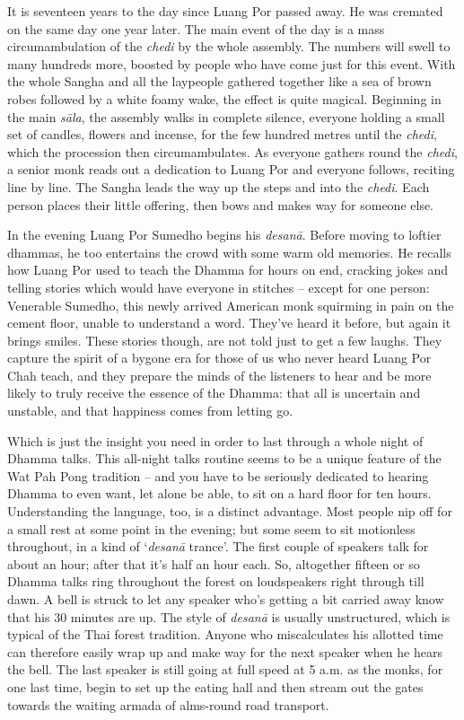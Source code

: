 It is seventeen years to the day since Luang Por passed away. He was
cremated on the same day one year later. The main event of the day is a
mass circumambulation of the \emph{chedi} by the whole assembly. The
numbers will swell to many hundreds more, boosted by people who have
come just for this event. With the whole Sangha and all the laypeople
gathered together like a sea of brown robes followed by a white foamy
wake, the effect is quite magical. Beginning in the main \emph{sāla}, 
the assembly walks in complete silence, everyone holding a small set of
candles, flowers and incense, for the few hundred metres until the
\emph{chedi}, which the procession then circumambulates. As everyone
gathers round the \emph{chedi}, a senior monk reads out a dedication to
Luang Por and everyone follows, reciting line by line. The Sangha leads
the way up the steps and into the \emph{chedi}. Each person places their
little offering, then bows and makes way for someone else. 

In the evening Luang Por Sumedho begins his \emph{desanā}. Before moving
to loftier dhammas, he too entertains the crowd with some warm old
memories. He recalls how Luang Por used to teach the Dhamma for hours on
end, cracking jokes and telling stories which would have everyone in
stitches -- except for one person: Venerable Sumedho, this newly arrived
American monk squirming in pain on the cement floor, unable to
understand a word. They've heard it before, but again it brings smiles. 
These stories though, are not told just to get a few laughs. They
capture the spirit of a bygone era for those of us who never heard Luang
Por Chah teach, and they prepare the minds of the listeners to hear and
be more likely to truly receive the essence of the Dhamma: that all is
uncertain and unstable, and that happiness comes from letting go. 

Which is just the insight you need in order to last through a whole
night of Dhamma talks. This all-night talks routine seems to be a unique
feature of the Wat Pah Pong tradition -- and you have to be seriously
dedicated to hearing Dhamma to even want, let alone be able, to sit on a
hard floor for ten hours. Understanding the language, too, is a distinct
advantage. Most people nip off for a small rest at some point in the
evening; but some seem to sit motionless throughout, in a kind of
`\emph{desanā} trance'. The first couple of speakers talk for about an
hour; after that it's half an hour each. So, altogether fifteen or so
Dhamma talks ring throughout the forest on loudspeakers right through
till dawn. A bell is struck to let any speaker who's getting a bit
carried away know that his 30 minutes are up. The style of \emph{desanā}
is usually unstructured, which is typical of the Thai forest tradition. 
Anyone who miscalculates his allotted time can therefore easily wrap up
and make way for the next speaker when he hears the bell. The last
speaker is still going at full speed at 5 a.m. as the monks, for one
last time, begin to set up the eating hall and then stream out the gates
towards the waiting armada of alms-round road transport. 

